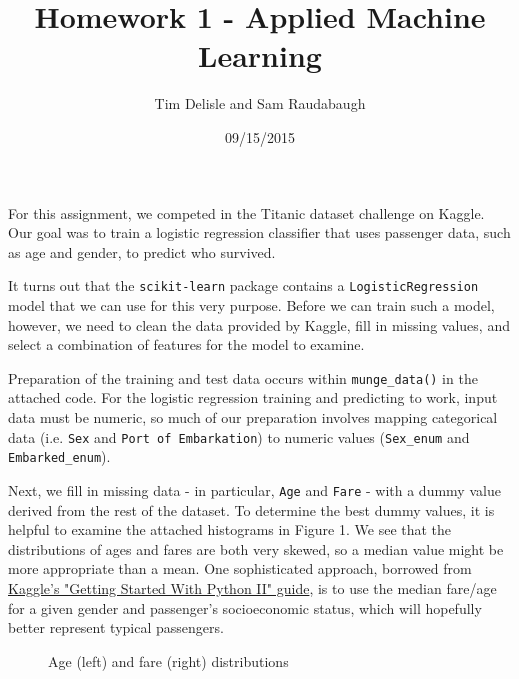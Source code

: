 \documentclass[12pt]{report}
\begin{document}
\lstset{language=Python}

\title{Homework 1 - Applied Machine Learning}
\author{Tim Delisle and Sam Raudabaugh}
\date{09/15/2015}
\maketitle



For this assignment, we competed in the Titanic dataset challenge on Kaggle. Our goal was to train a logistic regression classifier that uses passenger data, such as age and gender, to predict who
survived.

It turns out that the \verb+scikit-learn+ package contains a \verb+LogisticRegression+ model that we can use for this very purpose. Before we can train such a model, however, we need to clean the
data provided by Kaggle, fill in missing values, and select a combination of features for the model to examine.

Preparation of the training and test data occurs within \verb+munge_data()+ in the attached code. For the logistic regression training and predicting to work, input data must be numeric, so much
of our preparation involves mapping categorical data (i.e. \verb+Sex+ and \verb+Port of Embarkation+) to numeric values (\verb+Sex_enum+ and \verb+Embarked_enum+).

Next, we fill in missing data - in particular, \verb+Age+ and \verb+Fare+ - with a dummy value derived from the rest of the dataset. To determine the best dummy values, it is helpful to examine
the attached histograms in Figure 1. We see that the distributions of ages and fares are both very skewed, so a median value might be more appropriate than a mean. One sophisticated approach,
borrowed from \href{https://www.kaggle.com/c/titanic/details/getting-started-with-python-ii}{Kaggle's "Getting Started With Python II" guide}, is to use the median fare/age for a given gender
and passenger's socioeconomic status, which will hopefully better represent typical passengers.

\begin{figure}
\centering
{}
\caption{Age (left) and fare (right) distributions}
\end{figure}
\end{document}
